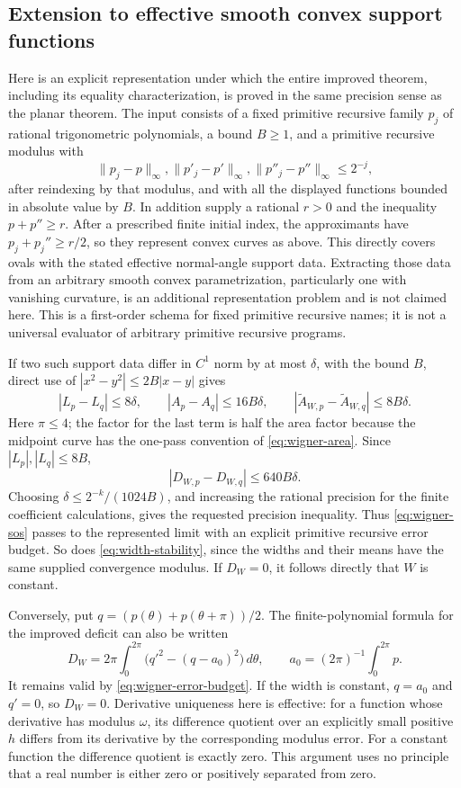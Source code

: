 \subsection{Extension to effective smooth convex support functions}
Here is an explicit representation under which the entire improved
theorem, including its equality characterization, is proved in the
same precision sense as the planar theorem.  The input consists of
a fixed primitive recursive family \(p_j\) of rational
trigonometric polynomials, a bound \(B\ge1\), and a primitive
recursive modulus with
\[
 \|p_j-p\|_\infty,
 \|p'_j-p'\|_\infty,
 \|p''_j-p''\|_\infty\le2^{-j},
\]
after reindexing by that modulus, and with all the displayed
functions bounded in absolute value by \(B\).  In addition supply
a rational \(r>0\) and the inequality \(p+p''\ge r\).
After a prescribed finite initial index, the approximants have
\(p_j+p_j''\ge r/2\), so they represent convex curves as above.
This directly covers ovals with the stated effective normal-angle
support data.  Extracting those data from an arbitrary smooth convex
parametrization, particularly one with vanishing curvature, is an
additional representation problem and is not claimed here.
This is a first-order schema for fixed primitive recursive names;
it is not a universal evaluator of arbitrary primitive recursive
programs.

If two such support data differ in \(C^1\) norm by at most
\(\delta\), with the bound \(B\), direct use of
\(|x^2-y^2|\le2B|x-y|\) gives
\begin{equation}\label{eq:wigner-error-budget}
 |L_p-L_q|\le8\delta,\qquad
 |A_p-A_q|\le16B\delta,\qquad
 |\widetilde A_{W,p}-\widetilde A_{W,q}|\le8B\delta.
\end{equation}
Here \(\pi\le4\); the factor for the last term is half the
area factor because the midpoint curve has the one-pass convention
of \eqref{eq:wigner-area}.  Since \(|L_p|,|L_q|\le8B\),
\[
                         |D_{W,p}-D_{W,q}|\le640B\delta.
\]
Choosing \(\delta\le2^{-k}/(1024B)\), and increasing the rational
precision for the finite coefficient calculations, gives the
requested precision inequality.  Thus \eqref{eq:wigner-sos}
passes to the represented limit with an explicit primitive recursive
error budget.  So does \eqref{eq:width-stability}, since the widths
and their means have the same supplied convergence modulus.
If \(D_W=0\), it follows directly that \(W\) is constant.

Conversely, put \(q=(p(\theta)+p(\theta+\pi))/2\).  The
finite-polynomial formula for the improved deficit can also be written
\[
 D_W=2\pi\int_0^{2\pi}
                 \bigl(q'^2-(q-a_0)^2\bigr)\,d\theta,
 \qquad a_0=(2\pi)^{-1}\int_0^{2\pi}p.
\]
It remains valid by \eqref{eq:wigner-error-budget}.  If the width
is constant, \(q=a_0\) and \(q'=0\), so \(D_W=0\).
Derivative uniqueness here is effective: for a function whose
derivative has modulus \(\omega\), its difference quotient over
an explicitly small positive \(h\) differs from its derivative
by the corresponding modulus error.  For a constant function the
difference quotient is exactly zero.  This argument uses no
principle that a real number is either zero or positively separated
from zero.

